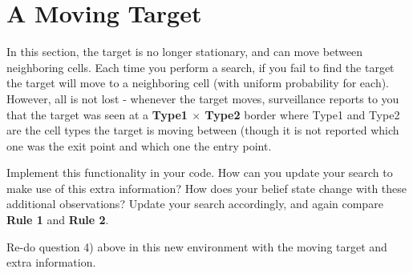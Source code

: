 \documentclass[letter]{article}
\begin{document}
\section{A Moving Target}
\label{sec:A Moving Target}
\par{In this section, the target is no longer stationary, and can move between neighboring cells. Each time you perform
	a search, if you fail to find the target the target will move to a neighboring cell (with uniform probability for each).
	However, all is not lost - whenever the target moves, surveillance reports to you that the target was seen at a \textbf{Type1
	$ \times $ Type2} border where Type1 and Type2 are the cell types the target is moving between (though it is not reported
	which one was the exit point and which one the entry point. }
	
\par{Implement this functionality in your code. How can you update your search to make use of this extra information?
	How does your belief state change with these additional observations? Update your search accordingly, and again
	compare \textbf{Rule 1} and \textbf{Rule 2}.}

\par{Re-do question 4) above in this new environment with the moving target and extra information.}
\end{document}
